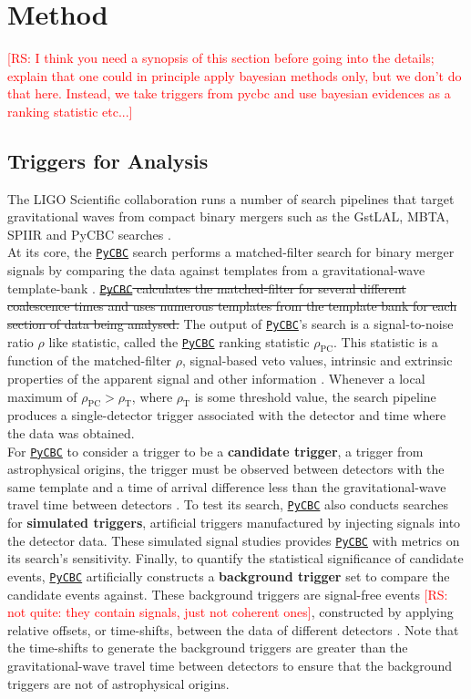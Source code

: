 \documentclass[%
preprint,
 amsmath,amssymb,
 aps,
]{revtex4}
\newcommand{\pycbc}{{\sc \href{https://pycbc.org/}{\texttt{PyCBC}}}\xspace}
\newcommand{\rs}[1]{\textcolor{red}{[RS: #1]}}
\begin{document}
\section{Method\label{sec:method}}
\rs{I think you need a synopsis of this section before going into the details; explain that one could in principle apply bayesian methods only, but we don't do that here. Instead, we take triggers from pycbc and use bayesian evidences as a ranking statistic etc...} 
\subsection{Triggers for Analysis}
The LIGO Scientific collaboration runs a number of search pipelines that target gravitational waves from compact binary mergers such as the GstLAL, MBTA, SPIIR and PyCBC searches \cite{abbott2019gwtc}.\\

At its core, the \pycbc \cite{pycbc_code} search performs a matched-filter search for binary merger signals by comparing the data against templates from a gravitational-wave template-bank \cite{pycbc_og6}. \sout{\pycbc calculates the matched-filter for several different coalescence times and uses numerous templates from the template bank for each section of data being analysed.} The output of \pycbc's search is a signal-to-noise ratio $\rho$ like statistic, called the \pycbc ranking statistic $\rho_\text{PC}$. This statistic is a function of the matched-filter $\rho$, signal-based veto values, intrinsic and extrinsic properties of the apparent signal and other information \cite{pycbc_og6}. Whenever a local maximum of $\rho_\text{PC} > \rho_\text{T}$, where $\rho_\text{T}$ is some threshold value, the search pipeline produces a single-detector trigger associated with the detector and time where the data was obtained.\\

For \pycbc to consider a trigger to be a \textbf{candidate trigger}, a trigger from astrophysical origins, the trigger must be observed between detectors with the same template and a time of arrival difference less than the gravitational-wave travel time between detectors \cite{pycbc_og6}. To test its search, \pycbc also conducts searches for \textbf{simulated triggers}, artificial triggers manufactured by injecting signals into the detector data. These simulated signal studies provides \pycbc with metrics on its search's sensitivity. Finally, to quantify the statistical significance of candidate events, \pycbc artificially constructs a \textbf{background trigger} set to compare the candidate events against. These background triggers are signal-free events \rs{not quite: they contain signals, just not coherent ones}, constructed by applying relative offsets, or time-shifts, between the data of different detectors \cite{pycbc_og6}. Note that the time-shifts to generate the background triggers are greater than the gravitational-wave travel time between detectors to ensure that the background triggers are not of astrophysical origins. \\
\end{document}
